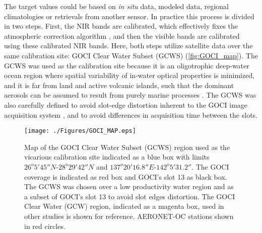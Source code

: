 \documentclass[]{interact}
\theoremstyle{plain}%
\theoremstyle{definition}
\theoremstyle{remark}
\begin{document}
The target values could be based on {\it in situ } data, modeled data, regional climatologies or retrievals from another sensor. In practice this process is divided in two steps. First, the NIR bands are calibrated, which effectively fixes the atmospheric correction algorithm \citep{Franz:07}, and then the visible bands are calibrated using these calibrated NIR bands.  Here, both steps utilize satellite data over the same calibration site: GOCI Clear Water Subset (GCWS) (\autoref{fig:GOCI_map}). The GCWS was used as the calibration site because it is an oligotrophic deep-water ocean region where spatial variability of in-water optical properties is minimized, and it is far from land and active volcanic islands, such that the dominant aerosols can be assumed to result from purely marine processes \citep{Franz:07}. The GCWS was also carefully defined to avoid slot-edge distortion inherent to the GOCI image acquisition system \citep{Kim:2015,Kim:2016}, and to avoid differences in acquisition time between the slots. 
\begin{figure}[H]
  \centering
  \texttt{[image: ./Figures/GOCI\_MAP.eps]}
    \caption{Map of the GOCI Clear Water Subset (GCWS) region used as the vicarious calibration site indicated as a blue box with limits $26^o 5' 45''N$-$28^o 29' 42''N$ and $137^o 20' 16.8''E$-$142^o 5' 31.2''$. The GOCI coverage is indicated as red box and GOCI's slot 13 as black box. The GCWS was chosen over a low productivity water region and as a subset of GOCI's slot 13 to avoid slot edges distortion. The GOCI Clear Water (GCW) region, indicated as a magenta box, used in other studies is shown for reference. AERONET-OC stations shown in red circles. \label{fig:GOCI_map}} 
\end{figure}


\end{document}
